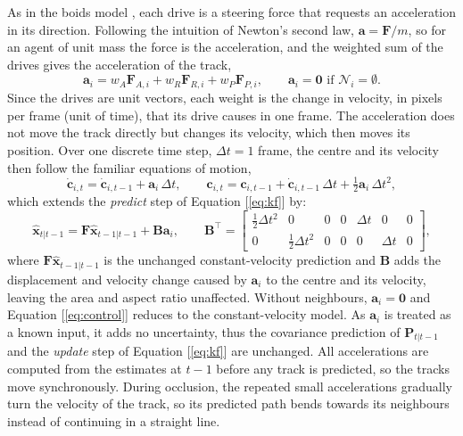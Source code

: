 \documentclass[9pt,twoside]{pnas-new}
\begin{document}
As in the boids model \cite{reynolds1999}, each drive is a steering force that requests an acceleration in its direction. 
Following the intuition of Newton's second law, $\mathbf{a} = \mathbf{F}/m$, so for an agent of unit mass the force is the acceleration, and the weighted sum of the drives gives the acceleration of the track,
\begin{equation}
  \mathbf{a}_i = w_A \mathbf{F}_{A,i} + w_R \mathbf{F}_{R,i} + w_P \mathbf{F}_{P,i},
  \qquad \mathbf{a}_i = \mathbf{0} \text{ if } \mathcal{N}_i = \emptyset.
  \label{eq:accel}
\end{equation}
Since the drives are unit vectors, each weight is the change in velocity, in pixels per frame (unit of time), that its drive causes in one frame.
The acceleration does not move the track directly but changes its velocity, which then moves its position.
Over one discrete time step, $\Delta t = 1$ frame, the centre and its velocity then follow the familiar equations of motion,
\begin{equation*}
  \dot{\mathbf{c}}_{i,t} = \dot{\mathbf{c}}_{i,t-1} + \mathbf{a}_i\,\Delta t, \qquad
  \mathbf{c}_{i,t} = \mathbf{c}_{i,t-1} + \dot{\mathbf{c}}_{i,t-1}\,\Delta t + \tfrac{1}{2}\mathbf{a}_i\,\Delta t^2,
\end{equation*}
which extends the \textit{predict} step of Equation [\ref{eq:kf}] by:
\begin{equation}
  \hat{\mathbf{x}}_{t|t-1} = \mathbf{F}\hat{\mathbf{x}}_{t-1|t-1} + \mathbf{B}\mathbf{a}_i,
  \qquad
  \mathbf{B}^\top =
  \begin{bmatrix}
    \tfrac{1}{2}\Delta t^2 & 0 & 0 & 0 & \Delta t & 0 & 0 \\
    0 & \tfrac{1}{2}\Delta t^2 & 0 & 0 & 0 & \Delta t & 0
  \end{bmatrix},
  \label{eq:control}
\end{equation}
where $\mathbf{F}\hat{\mathbf{x}}_{t-1|t-1}$ is the unchanged constant-velocity prediction and $\mathbf{B}$ adds the displacement and velocity change caused by $\mathbf{a}_i$ to the centre and its velocity, leaving the area and aspect ratio unaffected. 
Without neighbours, $\mathbf{a}_i = \mathbf{0}$ and Equation [\ref{eq:control}] reduces to the constant-velocity model.
As $\mathbf{a}_i$ is treated as a known input, it adds no uncertainty, thus the covariance prediction of $\mathbf{P}_{t|t-1}$ and the \textit{update} step of Equation [\ref{eq:kf}] are unchanged.
All accelerations are computed from the estimates at $t-1$ before any track is predicted, so the tracks move synchronously. 
During occlusion, the repeated small accelerations gradually turn the velocity of the track, so its predicted path bends towards its neighbours instead of continuing in a straight line.
\end{document}
